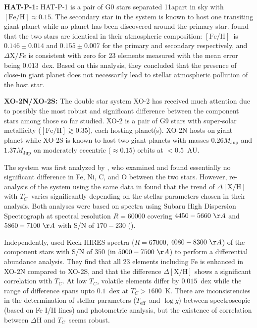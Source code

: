 \documentclass[manuscript]{aastex6}
\newcommand*\elem[1]{\ensuremath{\mathrm{#1}}}
\newcommand*\elemH[1]{\ensuremath{[\mathrm{#1}/\elem{H}]}}
\newcommand*\teff{\ensuremath{T_\mathrm{eff}}}
\newcommand*\logg{\ensuremath{\log{g}}}
\newcommand*{\feh}{\ensuremath{\elemH{Fe}}}
\newcommand{\Tcondens}{\ensuremath{T_C}}
\newcommand{\mjupiter}{\ensuremath{M_\mathrm{Jup}}}
\begin{document}
{\bf HAT-P-1:}
HAT-P-1 is a pair of G0 stars separated 11\farcs apart in sky
with $\feh\approx0.15$.
The secondary star in the system is known to host one transiting giant planet
while no planet has been discovered around the primary star.
\citealt{Liu:2014aa} found that the two stars are identical in their atmospheric composition:
\feh\ is $0.146 \pm 0.014$ and $0.155 \pm 0.007$ for the primary and secondary respectively,
and $\Delta\elem{X}/{Fe}$ is consistent with zero for 23 elements measured
with the mean error being $0.013$~dex.
Based on this analysis, they concluded that the presence of close-in giant planet
does not necessarily lead to stellar atmospheric pollution of the host star.

{\bf XO-2N/XO-2S:}
The double star system XO-2 has received much attention due to
possibly the most robust and significant difference between the component stars
among those so far studied.
XO-2 is a pair of G9 stars with super-solar metallicity ($\feh \gtrsim 0.35$),
each hosting planet(s).
XO-2N hosts on giant planet while XO-2S is known to host two giant planets with
masses $0.26 \mjupiter$ and $1.37 \mjupiter$ on moderately eccentric ($\approx
0.15$) orbits at $<0.5$~AU.

The system was first analyzed by \citealt{Teske:2013aa}, who examined and found
essentially no significant difference in Fe, Ni, C, and O between the two
stars.
However, re-analysis of the system using the same data in
\citealt{Teske:2015aa} found that the trend of $\Delta\elemH{X}$ with
\Tcondens\ varies significantly depending on the stellar parameters chosen in
their analysis. Both analyses were based on spectra
using Subaru High Dispersion Spectrograph at spectral resolution $R=60000$
covering $4450-5660~\AA$ and $5860-7100~\AA$ with S/N of $170-230$
(\citealt{Teske:2013aa}).

Independently, \citealt{Ramirez:2015aa} used Keck HIRES spectra ($R=67000$,
$4080-8300~\AA$) of the component stars with S/N of $350$ (in $5000-7500~\AA$)
to perform a differential abundance analysis.
They find that all 23 elements including Fe is enhanced in XO-2N
compared to XO-2S, and that the difference $\Delta\elemH{X}$ shows
a significant correlation with \Tcondens.
At low \Tcondens, volatile elements differ by $0.015$~dex
while the range of difference spans upto $0.1$~dex at $\Tcondens>1600$~K.
There are inconsistencies in the determination of stellar parameters
(\teff\ and \logg) between spectroscopic (based on Fe I/II lines)
and photometric analysis,
but the existence of correlation between $\Delta\elem{H}$ and
\Tcondens\ seems robust.
\end{document}
